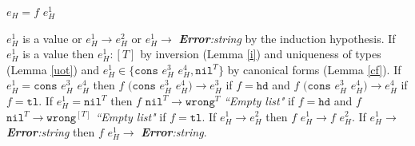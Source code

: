 \begin{case}
$e_{H}=f$ $e_{H}^{1}$

$e_{H}^{1}$ is a value or $e_{H}^{1}\rightarrow e_{H}^{2}$ or $e_{H}^{1}\rightarrow$ \emph{\textbf{Error}:\;string} by the induction hypothesis.  If $e_{H}^{1}$ is a value then $e_{H}^{1}:[T]$ by inversion (Lemma \ref{i}) and uniqueness of types (Lemma \ref{uot}) and $e_{H}^{1}\in\lbrace\mathtt{cons}$ $e_{H}^{3}$ $e_{H}^{4},\mathtt{nil}^{T}\rbrace$ by canonical forms (Lemma \ref{cf}).  If $e_{H}^{1}=\mathtt{cons}$ $e_{H}^{3}$ $e_{H}^{4}$ then $f$ $(\mathtt{cons}$ $e_{H}^{3}$ $e_{H}^{4})\rightarrow e_{H}^{3}$ if $f=\mathtt{hd}$ and $f$ $(\mathtt{cons}$ $e_{H}^{3}$ $e_{H}^{4})\rightarrow e_{H}^{4}$ if $f=\mathtt{tl}$.  If $e_{H}^{1}=\mathtt{nil}^{T}$ then $f$ $\mathtt{nil}^{T}\rightarrow\mathtt{wrong}^{T}$ \emph{``Empty list"} if $f=\mathtt{hd}$ and $f$ $\mathtt{nil}^{T}\rightarrow\mathtt{wrong}^{[T]}$ \emph{``Empty list"} if $f=\mathtt{tl}$.  If $e_{H}^{1}\rightarrow e_{H}^{2}$ then $f$ $e_{H}^{1}\rightarrow f$ $e_{H}^{2}$.  If $e_{H}^{1}\rightarrow$ \emph{\textbf{Error}:\;string} then $f$ $e_{H}^{1}\rightarrow$ \emph{\textbf{Error}:\;string}.
\end{case}